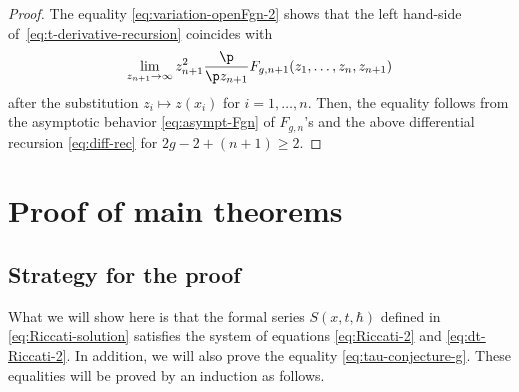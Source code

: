 \begin{proof}
The equality \eqref{eq:variation-openFgn-2} shows that
the left hand-side of~\eqref{eq:t-derivative-recursion}
coincides with
\begin{gather*}
\lim_{z_{n+1} \rightarrow \infty} z_{n+1}^{2}
\frac{\p}{\p z_{n+1}} F_{g,n+1}(z_{1},\dots,z_{n},z_{n+1})
\end{gather*}
after the substitution $z_{i} \mapsto z(x_{i})$ for $i=1,\dots,n$.
Then, the equality follows from
the asymptotic behavior \eqref{eq:asympt-Fgn} of $F_{g,n}$'s
and the above dif\/ferential recursion \eqref{eq:diff-rec}
for $2g-2+ (n+1) \ge 2$.
\end{proof}


\section{Proof of main theorems}
\label{section:proof}

\subsection{Strategy for the proof}

What we will show here is that the formal series $S(x,t,\hbar)$
def\/ined in \eqref{eq:Riccati-solution} satisf\/ies
the system of equations \eqref{eq:Riccati-2} and
\eqref{eq:dt-Riccati-2}. In addition, we will also prove
the equality \eqref{eq:tau-conjecture-g}.
These equalities will be proved by an induction as follows.

